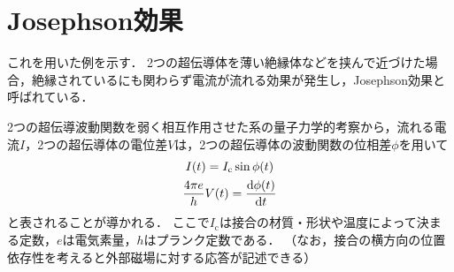 \documentclass[dvipdfmx,autodetect-engine,12pt,fleqn]{jsarticle}
\begin{document}
\section{Josephson効果}
これを用いた例を示す．
2つの超伝導体を薄い絶縁体などを挟んで近づけた場合，絶縁されているにも関わらず電流が流れる効果が発生し，Josephson効果と呼ばれている．

2つの超伝導波動関数を弱く相互作用させた系の量子力学的考察から，流れる電流$I$，2つの超伝導体の電位差$V$は，2つの超伝導体の波動関数の位相差$\phi$を用いて
\begin{gather}
    I(t)=I_{\text{c}}\sin\phi(t)\\
    \frac{4\pi e}{h}V(t)=\dv{\phi(t)}{t}
\end{gather}
と表されることが導かれる．
ここで$I_{\text{c}}$は接合の材質・形状や温度によって決まる定数，$e$は電気素量，$h$はプランク定数である．
（なお，接合の横方向の位置依存性を考えると外部磁場に対する応答が記述できる）
\end{document}
